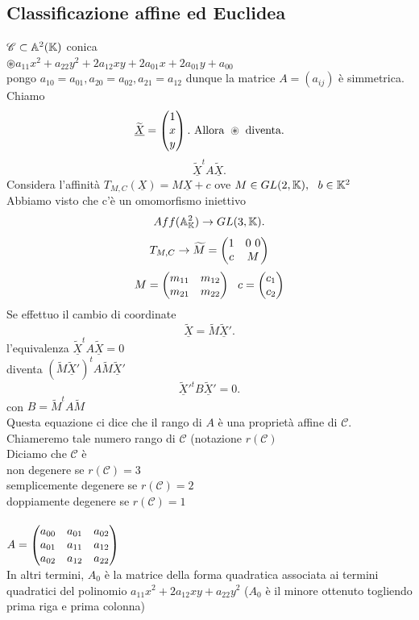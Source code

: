 \documentclass[12px]{article}
\begin{document}
\subsection{Classificazione affine ed Euclidea}
	$\mathscr{C} \subset \mathbb{A}^2(\mathbb{K}) $ conica\\
	$\circledast a_{11}x^2 + a_{22}y^2 + 2a_{12}xy + 2a_{01}x + 2a_{01}y + a_{00}$\\
	pongo $a_{10}=a_{01}, a_{20}=a_{02},a_{21}=a_{12}$ dunque la matrice $A=(a_{ij})$ è simmetrica. Chiamo
	\[
		\widetilde{\underline X} = \begin{pmatrix}1\\x\\y\end{pmatrix}. \text{ Allora } \circledast \text{ diventa}
	.\] 
	\[
	\underline{\widetilde{X}}^t A\underline{\widetilde{X}}
	.\] 
	Considera l'affinità $T_{M,C}(\underline X ) = M\underline X + c$ ove  $M\in GL(2,\mathbb{K}), \ \ b\in \mathbb{K}^2$\\
	Abbiamo visto che c'è un omomorfismo iniettivo 
	\[
	Aff(\mathbb{A}^2_{\mathbb{K}}) \rightarrow GL(3,\mathbb{K})
	.\] 
	\[
		T_{M,C} \rightarrow \widetilde M = \begin{pmatrix} 1 & 0\ 0\\ c & M \end{pmatrix}
	\] 
	\[
		M = \begin{pmatrix}m_{11}&m_{12}\\m_{21}&m_{22}\end{pmatrix} \ \ c = \begin{pmatrix}c_1\\c_2\end{pmatrix}
	\] 
	Se effettuo il cambio di coordinate
	\[
		\widetilde{\underline{X}} = \widetilde{M}\widetilde{\underline{X}}'
	.\] 
	l'equivalenza $\widetilde{\underline{X}}^t A \widetilde{\underline{X}} = 0$ \\
	diventa  $(\widetilde M\widetilde{\underline{X}}')^t A \widetilde{M}\widetilde{\underline {X}}'$ \\
	\[
	\widetilde{\underline{X}}'^t B \widetilde{\underline{X}}'= 0
	.\] 
	con $B = \widetilde{M}^t A\widetilde{M}$\\
	Questa equazione ci dice che il rango di  $A$ è una proprietà affine di $\mathscr{C}$. Chiameremo tale numero rango di $\mathscr{C}$ (notazione $r(\mathscr{C})$\\
	Diciamo che  $\mathscr{C}$ è\\
	non degenere se $r(\mathscr{C}) = 3$\\
	semplicemente degenere se  $r(\mathscr{C}) = 2$\\
	doppiamente degenere se  $r(\mathscr{C}) = 1$
	\ \\ \hline \ \\
	$A = \begin{pmatrix}a_{00}&a_{01} & a_{02}\\a_{01} & a_{11} & a_{12} \\ a_{02} & a_{12} & a_{22}\end{pmatrix}$ \\In altri termini, $A_0$ è la matrice della forma quadratica associata ai termini quadratici del polinomio $a_{11}x^2 + 2a_{12}xy + a_{22}y^ 2$ ($A_0$ è il minore ottenuto togliendo prima riga e prima colonna)\\
\end{document}
